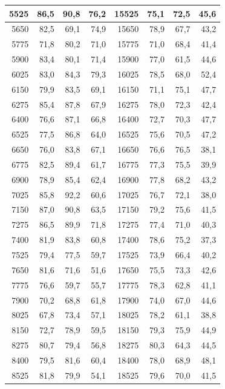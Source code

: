 \begin{small}
\begin{longtable}{|r|r|r|r|r|r|r|r|}
5525 & 86,5 & 90,8 & 76,2 & 15525 & 75,1 & 72,5 & 45,6 \\ \hline
5650 & 82,5 & 69,1 & 74,9 & 15650 & 78,9 & 67,7 & 43,2 \\ \hline
5775 & 71,8 & 80,2 & 71,0 & 15775 & 71,0 & 68,4 & 41,4 \\ \hline
5900 & 83,4 & 80,1 & 71,4 & 15900 & 77,0 & 61,5 & 44,6 \\ \hline
6025 & 83,0 & 84,3 & 79,3 & 16025 & 78,5 & 68,0 & 52,4 \\ \hline
6150 & 79,9 & 83,5 & 69,1 & 16150 & 71,1 & 75,1 & 47,7 \\ \hline
6275 & 85,4 & 87,8 & 67,9 & 16275 & 78,0 & 72,3 & 42,4 \\ \hline
6400 & 76,6 & 87,1 & 66,8 & 16400 & 72,7 & 70,3 & 47,7 \\ \hline
6525 & 77,5 & 86,8 & 64,0 & 16525 & 75,6 & 70,5 & 47,2 \\ \hline
6650 & 76,0 & 83,8 & 67,1 & 16650 & 76,6 & 76,5 & 38,1 \\ \hline
6775 & 82,5 & 89,4 & 61,7 & 16775 & 77,3 & 75,5 & 39,9 \\ \hline
6900 & 78,9 & 85,4 & 62,4 & 16900 & 77,8 & 68,2 & 43,2 \\ \hline
7025 & 85,8 & 92,2 & 60,6 & 17025 & 76,7 & 72,1 & 38,0 \\ \hline
7150 & 87,0 & 90,8 & 63,5 & 17150 & 79,2 & 75,6 & 41,5 \\ \hline
7275 & 86,5 & 89,9 & 71,8 & 17275 & 77,4 & 71,0 & 40,3 \\ \hline
7400 & 81,9 & 83,8 & 60,8 & 17400 & 78,6 & 75,2 & 37,3 \\ \hline
7525 & 79,4 & 77,5 & 59,7 & 17525 & 73,9 & 66,4 & 40,2 \\ \hline
7650 & 81,6 & 71,6 & 51,6 & 17650 & 75,5 & 73,3 & 42,6 \\ \hline
7775 & 76,6 & 59,7 & 55,7 & 17775 & 78,3 & 62,8 & 41,1 \\ \hline
7900 & 70,2 & 68,8 & 61,8 & 17900 & 74,0 & 67,0 & 44,6 \\ \hline
8025 & 67,8 & 73,4 & 57,1 & 18025 & 78,2 & 61,1 & 38,8 \\ \hline
8150 & 72,7 & 78,9 & 59,5 & 18150 & 79,3 & 75,9 & 44,9 \\ \hline
8275 & 80,7 & 79,4 & 56,8 & 18275 & 80,3 & 64,3 & 44,5 \\ \hline
8400 & 79,5 & 81,6 & 60,4 & 18400 & 78,0 & 68,9 & 48,1 \\ \hline
8525 & 81,8 & 79,9 & 54,1 & 18525 & 79,6 & 70,0 & 41,5 \\ \hline

\end{longtable}
\end{small}
